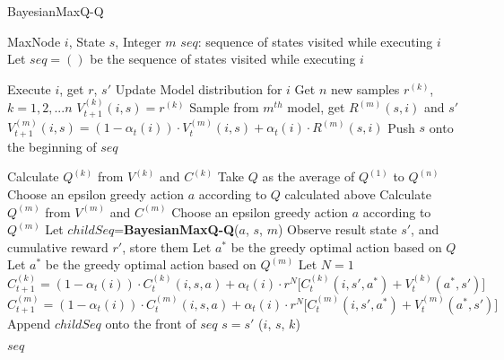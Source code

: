 \documentclass{article}
\begin{document}

\begin{algorithm}[t]
\caption{BayesianMaxQ-Q} \label{fig:MBBHRL}
\begin{algorithmic}[1]
\REQUIRE MaxNode $i$, State $s$, Integer $m$
\ENSURE $seq$: sequence of states visited while executing $i$
\STATE Let $seq=()$ be the sequence of states visited while executing $i$

\STATE Execute $i$, get $r$, $s'$
\STATE Update Model distribution for $i$
\STATE Get $n$ new samples $r^{(k)}$, $k=1, 2, ... n$
\STATE $V_{t+1}^{(k)}(i,s) = r^{(k)}$
\ENDFOR
\ELSE
\STATE Sample from $m^{th}$ model, get $R^{(m)}(s, i)$ and $s'$
\STATE $V_{t+1}^{(m)}(i,s) = (1-\alpha_t(i))\cdot V_t^{(m)}(i,s)+\alpha_t(i)\cdot R^{(m)}(s, i)$
\ENDIF
\STATE Push $s$ onto the beginning of $seq$

\ELSE
{}
\STATE Calculate $Q^{(k)}$ from $V^{(k)}$ and $C^{(k)}$
\ENDFOR
\STATE Take $Q$ as the average of $Q^{(1)}$ to $Q^{(n)}$
\STATE Choose an epsilon greedy action $a$ according to $Q$ calculated above
\ELSE
\STATE Calculate $Q^{(m)}$ from $V^{(m)}$ and $C^{(m)}$
\STATE Choose an epsilon greedy action $a$ according to $Q^{(m)}$
\ENDIF
\STATE Let $childSeq$={\bf BayesianMaxQ-Q}($a$, $s$, $m$)
\STATE Observe result state $s'$, and cumulative reward $r'$, store them
\STATE Let $a^*$ be the greedy optimal action based on $Q$
\ELSE
\STATE Let $a^*$ be the greedy optimal action based on $Q^{(m)}$
\ENDIF
\STATE Let $N=1$
\STATE $C_{t+1}^{(k)}=(1-\alpha_t(i))\cdot C_t^{(k)}(i,s,a) + \alpha_t(i)\cdot r^N\bigl[C_t^{(k)}(i,s',a^*)+V_t^{(k)}(a^*,s') \bigr]$
\ENDFOR
\ELSE
\STATE $C_{t+1}^{(m)}=(1-\alpha_t(i))\cdot C_t^{(m)}(i,s,a) + \alpha_t(i)\cdot r^N\bigl[C_t^{(m)}(i,s',a^*)+V_t^{(m)}(a^*,s') \bigr]$
\ENDIF
\ENDFOR
\STATE Append $childSeq$ onto the front of $seq$
\STATE $s=s'$
\ENDWHILE
{}
($i$, $s$, $k$)
\ENDFOR
\ENDIF

\RETURN $seq$
\ENDIF

\end{algorithmic}
\end{algorithm} 

\end{document}
